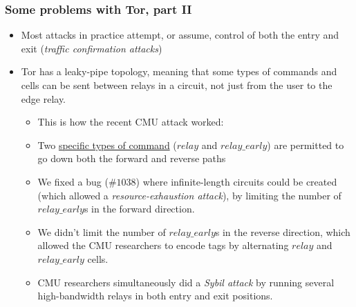\begin{frame}
  \frametitle{Some problems with Tor, part II}
  \begin{itemize}
    \item Most attacks in practice attempt, or assume, control of both the
      entry and exit (\emph{traffic confirmation attacks})
    \item<2-> Tor has a leaky-pipe topology, meaning that some types of commands
      and cells can be sent between relays in a circuit, not just from the user
      to the edge relay.
      \begin{itemize}
        \item<3-> This is how the recent CMU attack worked:
        \item<4-> Two
          \href{https://blog.torproject.org/blog/tor-security-advisory-relay-early-traffic-confirmation-attack/}{specific
            types of command} ($relay$ and $relay\_early$) are permitted to go
          down both the forward and reverse paths
        \item<5-> We fixed a bug ($\#1038$) where infinite-length circuits could
          be created (which allowed a \emph{resource-exhaustion attack}), by
          limiting the number of $relay\_early$s in the forward direction.
        \item<6-> We didn't limit the number of $relay\_early$s in the reverse
          direction, which allowed the CMU researchers to encode tags by
          alternating $relay$ and $relay\_early$ cells.
        \item<7-> CMU researchers simultaneously did a \emph{Sybil attack} by
          running several high-bandwidth relays in both entry and exit positions.
      \end{itemize}
  \end{itemize}
\end{frame}


